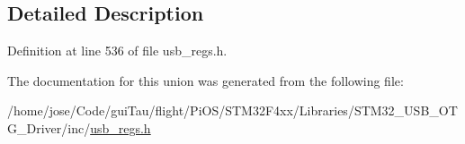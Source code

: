 \subsection{Detailed Description}


Definition at line 536 of file usb\-\_\-regs.\-h.



The documentation for this union was generated from the following file\-:\begin{DoxyCompactItemize}
\item 
/home/jose/\-Code/gui\-Tau/flight/\-Pi\-O\-S/\-S\-T\-M32\-F4xx/\-Libraries/\-S\-T\-M32\-\_\-\-U\-S\-B\-\_\-\-O\-T\-G\-\_\-\-Driver/inc/\hyperlink{_s_t_m32_f4xx_2_libraries_2_s_t_m32___u_s_b___o_t_g___driver_2inc_2usb__regs_8h}{usb\-\_\-regs.\-h}\end{DoxyCompactItemize}
